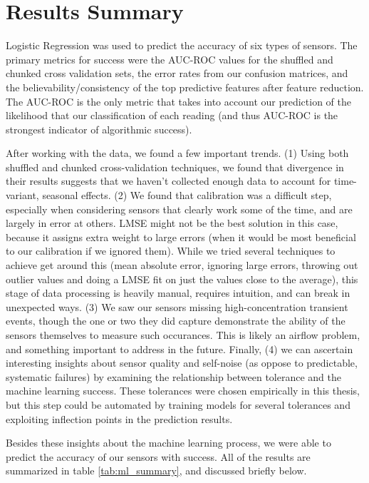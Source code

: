 \section{Results Summary}

Logistic Regression was used to predict the accuracy of six types of sensors.  The primary metrics for success were the AUC-ROC values for the shuffled and chunked cross validation sets, the error rates from our confusion matrices, and the believability/consistency of the top predictive features after feature reduction.  The AUC-ROC is the only metric that takes into account our prediction of the likelihood that our classification of each reading (and thus AUC-ROC is the strongest indicator of algorithmic success).  

After working with the data, we found a few important trends.  (1) Using both shuffled and chunked cross-validation techniques, we found that divergence in their results suggests that we haven't collected enough data to account for time-variant, seasonal effects.  (2) We found that calibration was a difficult step, especially when considering sensors that clearly work some of the time, and are largely in error at others.  LMSE might not be the best solution in this case, because it assigns extra weight to large errors (when it would be most beneficial to our calibration if we ignored them).  While we tried several techniques to achieve get around this (mean absolute error, ignoring large errors, throwing out outlier values and doing a LMSE fit on just the values close to the average), this stage of data processing is heavily manual, requires intuition, and can break in unexpected ways.  (3) We saw our sensors missing high-concentration transient events, though the one or two they did capture demonstrate the ability of the sensors themselves to measure such occurances.  This is likely an airflow problem, and something important to address in the future.  Finally, (4) we can ascertain interesting insights about sensor quality and self-noise (as oppose to predictable, systematic failures) by examining the relationship between tolerance and the machine learning success.  These tolerances were chosen empirically in this thesis, but this step could be automated by training models for several tolerances and exploiting inflection points in the prediction results.  

Besides these insights about the machine learning process, we were able to predict the accuracy of our sensors with success.  All of the results are summarized in table \ref{tab:ml_summary}, and discussed briefly below.

